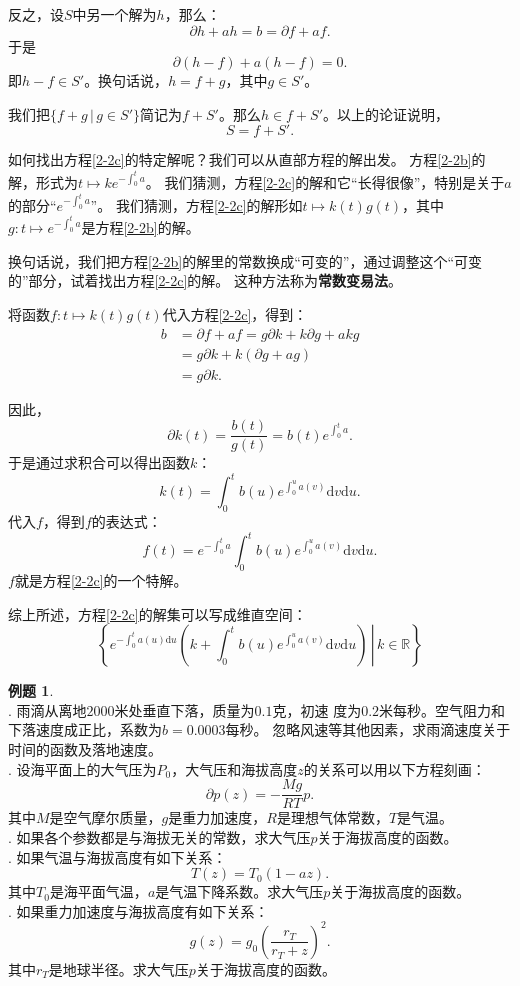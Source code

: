 \documentclass[12pt,UTF8]{ctexbook}
\theoremstyle{definition}
\newtheorem{et}{例题}[section]
\theoremstyle{plain}
\begin{document}
反之，设$S$中另一个解为$h$，那么：
$$ \partial h + a h = b = \partial f + a f. $$
于是
$$ \partial (h - f) + a (h - f) = 0. $$
即$h - f \in S'$。换句话说，$h = f + g$，其中$g\in S'$。

我们把$\{f + g \, | \, g\in S'\}$简记为$f + S'$。那么$h\in f + S'$。以上的论证说明，
$$S = f + S'. $$

如何找出方程\eqref{2-2c}的特定解呢？我们可以从直部方程的解出发。
方程\eqref{2-2b}的解，形式为$t\mapsto ke^{-\int_0^t a}$。
我们猜测，方程\eqref{2-2c}的解和它“长得很像”，特别是关于$a$的部分“$e^{-\int_0^t a}$”。
我们猜测，方程\eqref{2-2c}的解形如$t\mapsto k(t) g(t)$，其中$g: t\mapsto e^{-\int_0^t a}$是方程\eqref{2-2b}的解。

换句话说，我们把方程\eqref{2-2b}的解里的常数换成“可变的”，通过调整这个“可变的”部分，试着找出方程\eqref{2-2c}的解。
这种方法称为\textbf{常数变易法}。

将函数$f: t\mapsto k(t) g(t)$代入方程\eqref{2-2c}，得到：
\begin{align*}
    b &= \partial f + a f = g \partial k + k \partial g + a k g \\
    &= g\partial k + k (\partial g + a g) \\
    &= g\partial k.
\end{align*}

因此，
$$ \partial k(t) = \frac{b(t)}{g(t)} = b(t) e^{\int_0^t a}. $$
于是通过求积合可以得出函数$k$：
$$ k(t) = \int_0^t b(u) e^{\int_0^u a(v)}\mathrm{d}v \mathrm{d}u. $$
代入$f$，得到$f$的表达式：
$$ f(t) = e^{-\int_0^t a} \int_0^t b(u) e^{\int_0^u a(v)}\mathrm{d}v \mathrm{d}u. $$
$f$就是方程\eqref{2-2c}的一个特解。

综上所述，方程\eqref{2-2c}的解集可以写成维直空间：
$$\left\{\left.e^{-\int_0^t a(u)\mathrm{d}u} \left(k + \int_0^t b(u) e^{\int_0^u a(v)}\mathrm{d}v \mathrm{d}u\right) \, \right| \, k\in \mathbb{R}\right\}$$

\begin{et}
    \mbox{} \\
    . 雨滴从离地$2000$米处垂直下落，质量为$0.1$克，初速
    度为$0.2$米每秒。空气阻力和下落速度成正比，系数为$b=0.0003$每秒。
    忽略风速等其他因素，求雨滴速度关于时间的函数及落地速度。\\
    . 设海平面上的大气压为$P_0$，大气压和海拔高度$z$的关系可以用以下方程刻画：
    $$ \partial p(z) = -\frac{Mg}{RT} p. $$
    其中$M$是空气摩尔质量，$g$是重力加速度，$R$是理想气体常数，$T$是气温。\\
    . 如果各个参数都是与海拔无关的常数，求大气压$p$关于海拔高度的函数。\\
    . 如果气温与海拔高度有如下关系：
    $$ T(z) = T_0(1 - az).$$
    其中$T_0$是海平面气温，$a$是气温下降系数。求大气压$p$关于海拔高度的函数。\\
    . 如果重力加速度与海拔高度有如下关系：
    $$ g(z) = g_0 \left(\frac{r_T}{r_T + z}\right)^2. $$
    其中$r_T$是地球半径。求大气压$p$关于海拔高度的函数。

\end{et}
\end{document}
